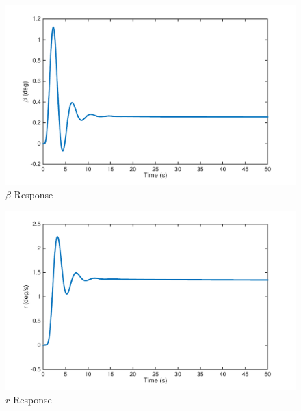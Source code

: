 \documentclass[12pt]{article}
\begin{document}
\clearpage
\begin{figure}[h!]
\begin{center}
\includegraphics[height=.4\textheight]{figures/beta}
\caption{$\beta$ Response}
\end{center}
\end{figure}

\begin{figure}[h!]
\begin{center}
\includegraphics[height=.4\textheight]{figures/r}
\caption{$r$ Response}
\end{center}
\end{figure}
\end{document}
